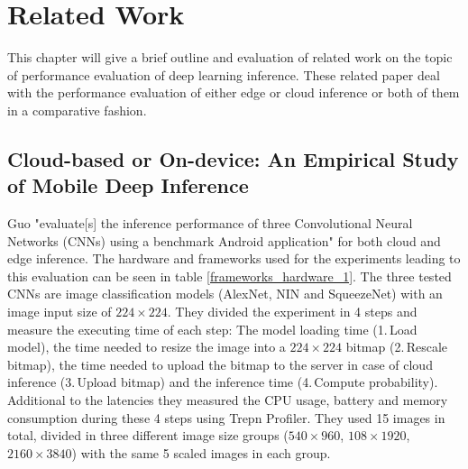 \chapter{Related Work}
\label{chap:relatedWork}
This chapter will give a brief outline and evaluation of related work on the topic of performance evaluation of deep learning inference. These related paper deal with the performance evaluation of either edge or cloud inference or both of them in a comparative fashion.



\section{Cloud-based or On-device:
An Empirical Study of Mobile Deep Inference}
Guo "evaluate[s] the inference performance of three Convolutional Neural Networks
(CNNs) using a benchmark Android application" \cite{DBLP:conf/ic2e/Guo18} for both cloud and edge inference. The hardware and frameworks used for the experiments leading to this evaluation can be seen in table \ref{frameworks_hardware_1}. The three tested CNNs are image classification models (AlexNet, NIN and SqueezeNet) with an image input size of $224\times224$.
They divided the experiment in 4 steps and measure the executing time of each step: 
The model loading time (1.\,Load model), the time needed to resize the image into a $224\times224$ bitmap (2.\,Rescale bitmap), the time needed to upload the bitmap to the server in case of cloud inference (3.\,Upload bitmap) and the inference time (4.\,Compute probability).
Additional to the latencies they measured the CPU usage, battery and memory consumption during these 4 steps using Trepn Profiler.
They used 15 images in total, divided in three different image size groups ($540\times960$, $108\times1920$, $2160\times3840$) with the same 5 scaled images in each group.

